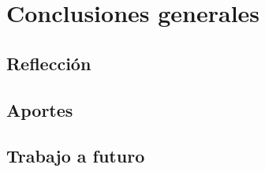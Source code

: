 \chapter{Conclusiones generales}
\label{ch:con}

\section{Reflección}

\section{Aportes}

\section{Trabajo a futuro}